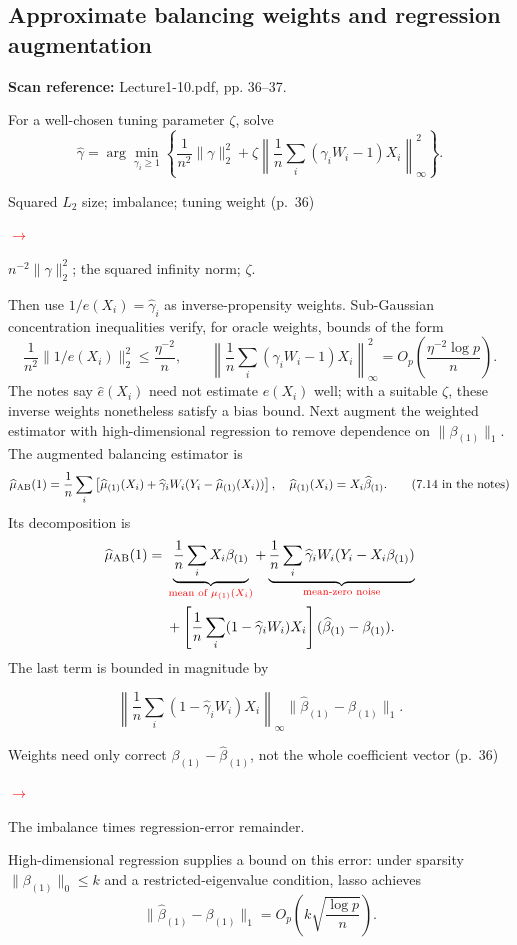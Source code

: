 \documentclass[11pt,a4paper]{article}
\newcommand{\sourcepages}[1]{\par{\small\sffamily\color{muted}\textbf{Scan reference:} #1\par}\nobreak\smallskip\nopagebreak[4]}
\newcommand{\inkred}[1]{\textcolor{red}{#1}}
\newenvironment{inkblock}[1]{\par\begingroup\color{#1}}{\par\endgroup}
\newcommand{\notearrow}[3]{%
\par\Needspace{6\baselineskip}\smallskip
\noindent\begin{minipage}[c]{0.43\linewidth}\raggedright\color{#1}#2\end{minipage}%
\hfill\textcolor{#1}{\(\longrightarrow\)}\hfill%
\begin{minipage}[c]{0.43\linewidth}\raggedright#3\end{minipage}\par\smallskip}
\begin{document}
\subsection{Approximate balancing weights and regression augmentation}
\sourcepages{Lecture1-10.pdf, pp. 36--37.}
For a well-chosen tuning parameter $\zeta$, solve
\[
\widehat\gamma=\arg\min_{\gamma_i\geq1}
\left\{\frac1{n^2}\|\gamma\|_2^2+
\zeta\left\|\frac1n\sum_i(\gamma_iW_i-1)X_i\right\|_\infty^2\right\}.
\tag{7.12 in the notes}
\]
\notearrow{red}{Squared $L_2$ size; imbalance; tuning weight (p.~36)}{$n^{-2}\|\gamma\|_2^2$; the squared infinity norm; $\zeta$.} Then use $1/\widehat e(X_i)=\widehat\gamma_i$ as inverse-propensity weights. Sub-Gaussian concentration inequalities verify, for oracle weights, bounds of the form
\[
\frac1{n^2}\|1/e(X_i)\|_2^2\leq\frac{\eta^{-2}}n,
\qquad
\left\|\frac1n\sum_i(\gamma_iW_i-1)X_i\right\|_\infty^2
=O_p\left(\frac{\eta^{-2}\log p}{n}\right).
\]
The notes say $\widehat e(X_i)$ need not estimate $e(X_i)$ well; with a suitable $\zeta$, these inverse weights nonetheless satisfy a bias bound.
Next augment the weighted estimator with high-dimensional regression to remove dependence on $\|\beta_{(1)}\|_1$. The augmented balancing estimator is
\[
\widehat\mu_{\rm AB}(1)=\frac1n\sum_i
\left[\widehat\mu_{(1)}(X_i)+\widehat\gamma_iW_i(Y_i-\widehat\mu_{(1)}(X_i))\right],
\quad\widehat\mu_{(1)}(X_i)=X_i\widehat\beta_{(1)}.
\tag{7.14 in the notes}
\]
Its decomposition is
\begin{align*}
\widehat\mu_{\rm AB}(1)={}&\underbrace{\frac1n\sum_iX_i\beta_{(1)}}_{\text{\inkred{mean of }}\textcolor{red}{\mu_{(1)}(X_i)}}
+\underbrace{\frac1n\sum_i\widehat\gamma_iW_i(Y_i-X_i\beta_{(1)})}_{\text{\inkred{mean-zero noise}}}\\
&+\left[\frac1n\sum_i(1-\widehat\gamma_iW_i)X_i\right](\widehat\beta_{(1)}-\beta_{(1)}).
\end{align*}
The last term is bounded in magnitude by
\begin{inkblock}{red}
\[
\left\|\frac1n\sum_i(1-\widehat\gamma_iW_i)X_i\right\|_\infty
\|\widehat\beta_{(1)}-\beta_{(1)}\|_1.
\]
\end{inkblock}
\notearrow{red}{Weights need only correct $\beta_{(1)}-\widehat\beta_{(1)}$, not the whole coefficient vector (p.~36)}{The imbalance times regression-error remainder.} High-dimensional regression supplies a bound on this error: under sparsity $\|\beta_{(1)}\|_0\leq k$ and a restricted-eigenvalue condition, lasso achieves
\[
\|\widehat\beta_{(1)}-\beta_{(1)}\|_1
=O_p\left(k\sqrt{\frac{\log p}{n}}\right).
\]
\end{document}
